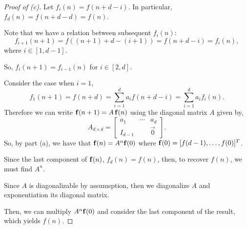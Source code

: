 \documentclass[../hw1]{subfiles}
\begin{document}
\begin{proof}[Proof of (c)]
	Let $f_i(n)=f(n+d-i)$.
	In particular, $f_d(n)=f(n+d-d)=f(n)$.

	Note that we have a relation between subsequent $f_i(n)$: \[
		f_{i+1}(n+1)=f((n+1)+d-(i+1))=f(n+d-i)=f_i(n)
		,\] where $i \in [1,d-1]$.

	So, $f_i(n+1) = f_{i-1}(n)$ for $i \in [2,d]$.

	Consider the case when $i=1$, \[
		f_1(n+1)=
		f(n+d)=
		\sum_{i=1}^{d}a_i f(n+d-i) =
		\sum_{i=1}^{d}a_i f_i(n)
		.\]
	Therefore we can write $\bf{f}(n+1)=A\, \bf{f}(n)$ using the diagonal matrix $A$ given by, \[
		A_{d\times d}=\begin{bmatrix}
			a_1     & \cdots & a_d     \\
			I_{d-1} &        & \vec{0}
		\end{bmatrix}.\]
	So, by part (a), we have that $\bf{f}(n) = A^n \bf{f}(0)$ where $\bf{f}(0)=[f(d-1),\ldots,f(0)]^{T}$.

	Since the last component of $\bf{f}(n)$, $f_d(n)=f(n)$, then, to recover $f(n)$, we must find $A^n$.

	Since $A$ is diagonalizable by assumsption, then we diagonalize $A$ and exponentiation its diagonal matrix.

	Then, we can multiply $A^n\bf{f}(0)$ and consider the last component of the result, which yields $f(n)$.
\end{proof}
\end{document}
